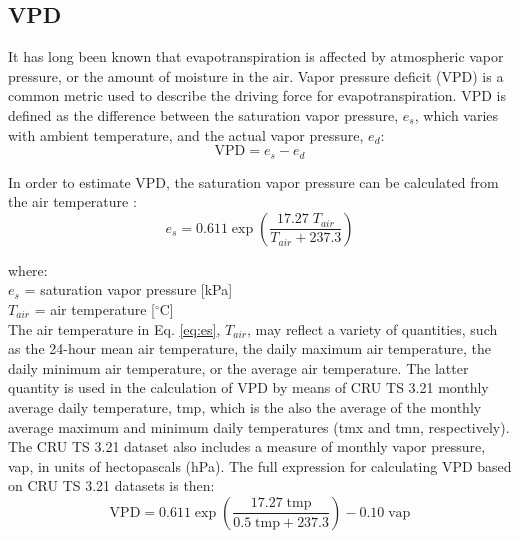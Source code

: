 \subsection{VPD}
\label{sec:gepvpd}
It has long been known that evapotranspiration is affected by atmospheric vapor pressure, or the amount of moisture in the air. 
Vapor pressure deficit (VPD) is a common metric used to describe the driving force for evapotranspiration.  
VPD is defined as the difference between the saturation vapor pressure, $e_s$, which varies with ambient temperature, and the actual vapor pressure, $e_d$:
\begin{equation}
\label{eq:vpd_basic}
    \text{VPD} = e_s - e_d
\end{equation} 

In order to estimate VPD, the saturation vapor pressure can be calculated from the air temperature \parencite[Eq. 5.1]{abtew13}:
%
\begin{equation}
\label{eq:es}
    e_s = 0.611 \exp \left( \frac{17.27\; T_{air}}{T_{air} + 237.3} \right)
\end{equation}

\noindent where:\\
\indent $e_s$ = saturation vapor pressure [kPa]\\
\indent $T_{air}$ = air temperature [$^{\circ}$C]\\

\noindent The air temperature in Eq. \ref{eq:es}, $T_{air}$, may reflect a variety of quantities, such as the 24-hour mean air temperature, the daily maximum air temperature, the daily minimum air temperature, or the average air temperature.  
The latter quantity is used in the calculation of VPD by means of CRU TS 3.21 monthly average daily temperature, tmp, which is the also the average of the monthly average maximum and minimum daily temperatures (tmx and tmn, respectively).  
The CRU TS 3.21 dataset also includes a measure of monthly vapor pressure, vap, in units of hectopascals (hPa).
The full expression for calculating VPD based on CRU TS 3.21 datasets is then:
\begin{equation}
\label{eq:vpd}
    \text{VPD} = 0.611 \exp \left( \frac{17.27\; \text{tmp}}
                 {0.5\; \text{tmp} + 237.3} \right) - 0.10\; \text{vap}
\end{equation}

